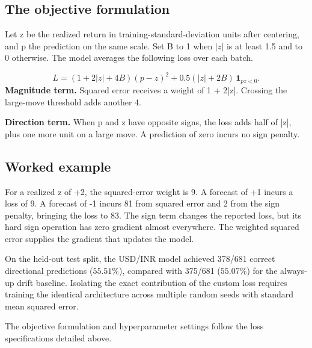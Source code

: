 \documentclass[12pt,a4paper,twoside,openany]{report}
\begin{document}
\subsection*{The objective formulation}
Let z be the realized return in training-standard-deviation units after centering, and p the prediction on the same scale. Set B to 1 when $|z|$ is at least 1.5 and to 0 otherwise. The model averages the following loss over each batch.\par
\[ L=(1+2|z|+4B)(p-z)^2+0.5(|z|+2B)\,\mathbf{1}_{pz<0}. \]
\textbf{Magnitude term.} Squared error receives a weight of 1 + 2|z|. Crossing the large-move threshold adds another 4.\par
\textbf{Direction term.} When p and z have opposite signs, the loss adds half of |z|, plus one more unit on a large move. A prediction of zero incurs no sign penalty.\par
\subsection*{Worked example}
For a realized z of +2, the squared-error weight is 9. A forecast of +1 incurs a loss of 9. A forecast of -1 incurs 81 from squared error and 2 from the sign penalty, bringing the loss to 83. The sign term changes the reported loss, but its hard sign operation has zero gradient almost everywhere. The weighted squared error supplies the gradient that updates the model.\par
On the held-out test split, the USD/INR model achieved 378/681 correct directional predictions ($55.51\%$), compared with 375/681 ($55.07\%$) for the always-up drift baseline. Isolating the exact contribution of the custom loss requires training the identical architecture across multiple random seeds with standard mean squared error.\par
The objective formulation and hyperparameter settings follow the loss specifications detailed above.\par
\end{document}
